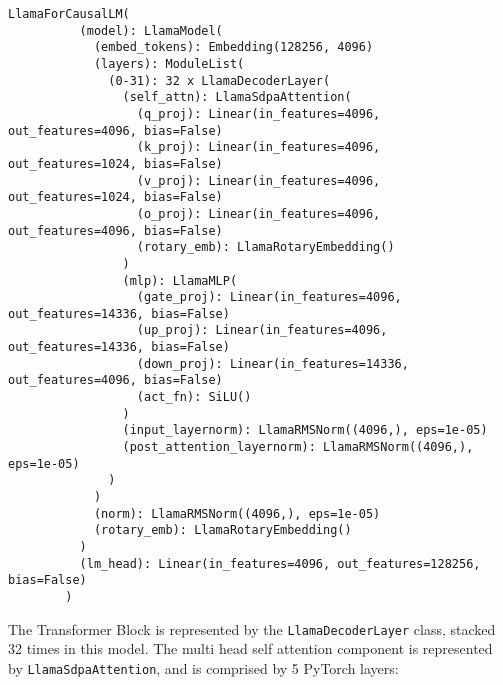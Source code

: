 \documentclass{article}
\begin{document}
    \begin{lstlisting}[label={lst:lsting1}]
        LlamaForCausalLM(
          (model): LlamaModel(
            (embed_tokens): Embedding(128256, 4096)
            (layers): ModuleList(
              (0-31): 32 x LlamaDecoderLayer(
                (self_attn): LlamaSdpaAttention(
                  (q_proj): Linear(in_features=4096, out_features=4096, bias=False)
                  (k_proj): Linear(in_features=4096, out_features=1024, bias=False)
                  (v_proj): Linear(in_features=4096, out_features=1024, bias=False)
                  (o_proj): Linear(in_features=4096, out_features=4096, bias=False)
                  (rotary_emb): LlamaRotaryEmbedding()
                )
                (mlp): LlamaMLP(
                  (gate_proj): Linear(in_features=4096, out_features=14336, bias=False)
                  (up_proj): Linear(in_features=4096, out_features=14336, bias=False)
                  (down_proj): Linear(in_features=14336, out_features=4096, bias=False)
                  (act_fn): SiLU()
                )
                (input_layernorm): LlamaRMSNorm((4096,), eps=1e-05)
                (post_attention_layernorm): LlamaRMSNorm((4096,), eps=1e-05)
              )
            )
            (norm): LlamaRMSNorm((4096,), eps=1e-05)
            (rotary_emb): LlamaRotaryEmbedding()
          )
          (lm_head): Linear(in_features=4096, out_features=128256, bias=False)
        )
    \end{lstlisting}

    The Transformer Block is represented by the \texttt{LlamaDecoderLayer} class, stacked 32 times in this model.
    The multi head self attention component is represented by \texttt{LlamaSdpaAttention}, and is comprised by 5 PyTorch layers:
\end{document}
